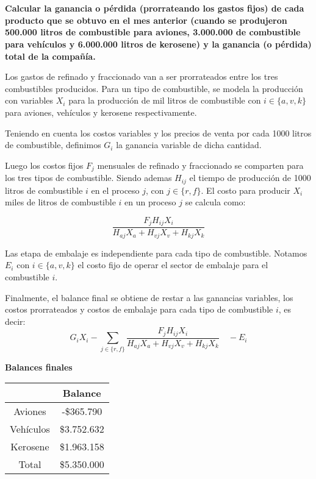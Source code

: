 \documentclass[10pt,a4paper]{article}
\begin{document}
	\section{}
	\textbf{Calcular la ganancia o pérdida (prorrateando los gastos fijos) de cada producto que se obtuvo en el mes
		anterior (cuando se produjeron 500.000 litros de combustible para aviones, 3.000.000 de combustible para
		vehículos y 6.000.000 litros de kerosene) y la ganancia (o pérdida) total de la compañía.}
	
	\vspace{5mm}
	
	Los gastos de refinado y fraccionado van a ser prorrateados entre los tres combustibles producidos. Para un tipo de combustible, se modela la producción con variables $X_i$ para la producción de mil litros de combustible con $i \in  \{a,v,k\}$ para aviones, vehículos y kerosene respectivamente.
	
	Teniendo en cuenta los costos variables y los precios de venta por cada 1000 litros de combustible, definimos $G_i$ la ganancia variable de dicha cantidad.
	
	Luego los costos fijos $F_j$ mensuales de refinado y fraccionado se comparten para los tres tipos de combustible. Siendo ademas $H_{ij}$ el tiempo de producción de 1000 litros de combustible $i$ en el proceso $j$, con $j \in \{r, f\}$. El costo para producir $X_i$ miles de litros de combustible $i$ en un proceso $j$ se calcula como:
	
	$$
	\frac{F_j H_{ij} X_i}{H_{aj}X_a + H_{vj}X_v + H_{kj}X_k}
	$$
	
	Las etapa de embalaje es independiente para cada tipo de combustible. Notamos $E_i$ con $i \in \{a,v,k\}$ el costo fijo de operar el sector de embalaje para el combustible $i$.
	
	Finalmente, el balance final se obtiene de restar a las ganancias variables, los costos prorrateados y costos de embalaje para cada tipo de combustible $i$, es decir:
	$$
	G_i X_i - \sum_{j\in\{r,f\}}{\frac{F_j H_{ij} X_i}{H_{aj}X_a + H_{vj}X_v + H_{kj}X_k}} \quad  - E_i
	$$
	
	\clearpage
	
	\begin{center}
		\textbf{Balances finales}
		\vspace{3mm}
		
		\begin{tabular}{| c | c |}
			\hline
			&           Balance    \\
			\hline
			Aviones   & -\$365.790  \\
			\hline
			Vehículos & \$3.752.632 \\
			\hline
			Kerosene  & \$1.963.158 \\
			\hline
			Total     & \$5.350.000\\
			\hline
		\end{tabular}
	\end{center}
	
\end{document}
